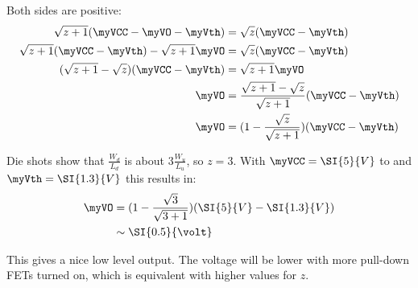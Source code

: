 Both sides are positive:
\tabletextsize
\begin{align}
    \sqrt{z+1} (\myVCC - \myVO - \myVth) &=
                    \sqrt{z} (\myVCC - \myVth)                  \notag \\
    \sqrt{z+1} (\myVCC - \myVth) - \sqrt{z+1} \myVO &=
                    \sqrt{z} (\myVCC - \myVth)                  \notag \\
    (\sqrt{z+1} - \sqrt{z}) (\myVCC - \myVth) &= \sqrt{z+1} \myVO
                                                                \notag \\
    \myVO &= \frac{\sqrt{z+1} - \sqrt{z}}{\sqrt{z+1}} (\myVCC - \myVth)
                                                                \notag \\
\label{eq:vout}
    \myVO &= (1 - \frac{\sqrt{z}}{\sqrt{z+1}}) (\myVCC - \myVth)
\end{align}
\normalsize

Die shots show that $\frac{W_d}{L_d}$ is about $3 \frac{W_u}{L_u}$, so $z = 3$.
With $\myVCC = \SI{5}{V}$ to and $\myVth = \SI{1.3}{V}$ this results in:
\tabletextsize
\begin{align*}
    \myVO &= (1 - \frac{\sqrt{3}}{\sqrt{3+1}}) (\SI{5}{V} - \SI{1.3}{V}) \\
          &\sim \SI{0.5}{\volt}
\end{align*}
\normalsize

This gives a nice low level output. The voltage will be lower with more
pull-down FETs turned on, which is equivalent with higher values for $z$.

